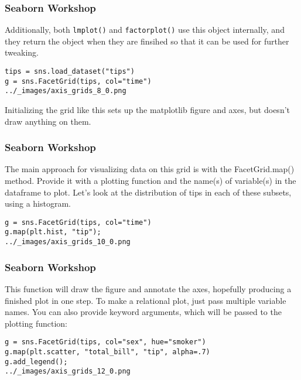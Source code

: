 \documentclass{beamer}
\begin{document}
\begin{frame}[fragile]
\frametitle{Seaborn Workshop}
\large

Additionally, both \texttt{lmplot()} and \texttt{factorplot()} use this object internally, and they return the object when they are finsihed so that it can be used for further tweaking.
\begin{verbatim}
tips = sns.load_dataset("tips")
g = sns.FacetGrid(tips, col="time")
../_images/axis_grids_8_0.png
\end{verbatim}
Initializing the grid like this sets up the matplotlib figure and axes, but doesn’t draw anything on them.
\end{frame}
\begin{frame}[fragile]
\frametitle{Seaborn Workshop}
\large

The main approach for visualizing data on this grid is with the FacetGrid.map() method. Provide it with a plotting function and the name(s) of variable(s) in the dataframe to plot. Let’s look at the distribution of tips in each of these subsets, using a histogram.

\begin{verbatim}
g = sns.FacetGrid(tips, col="time")
g.map(plt.hist, "tip");
../_images/axis_grids_10_0.png
\end{verbatim}
\end{frame}
\begin{frame}[fragile]
\frametitle{Seaborn Workshop}
\large
This function will draw the figure and annotate the axes, hopefully producing a finished plot in one step. To make a relational plot, just pass multiple variable names. You can also provide keyword arguments, which will be passed to the plotting function:
\begin{verbatim}
g = sns.FacetGrid(tips, col="sex", hue="smoker")
g.map(plt.scatter, "total_bill", "tip", alpha=.7)
g.add_legend();
../_images/axis_grids_12_0.png
\end{verbatim}
\end{frame}
\end{document}
